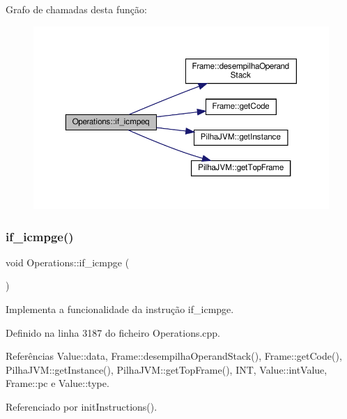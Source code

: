 Grafo de chamadas desta função\+:
\nopagebreak
\begin{figure}[H]
\begin{center}
\leavevmode
\includegraphics[width=350pt]{classOperations_a43a49ccd4f1160c0b1968af4296fa2b3_cgraph}
\end{center}
\end{figure}
\mbox{\label{classOperations_a147f088fabd19030a535ac68ff091be1}} 
\subsubsection{\texorpdfstring{if\+\_\+icmpge()}{if\_icmpge()}}
{\footnotesize\ttfamily void Operations\+::if\+\_\+icmpge (\begin{DoxyParamCaption}{ }\end{DoxyParamCaption})\hspace{0.3cm}{\ttfamily [private]}}



Implementa a funcionalidade da instrução if\+\_\+icmpge. 



Definido na linha 3187 do ficheiro Operations.\+cpp.



Referências Value\+::data, Frame\+::desempilha\+Operand\+Stack(), Frame\+::get\+Code(), Pilha\+J\+V\+M\+::get\+Instance(), Pilha\+J\+V\+M\+::get\+Top\+Frame(), I\+NT, Value\+::int\+Value, Frame\+::pc e Value\+::type.



Referenciado por init\+Instructions().

